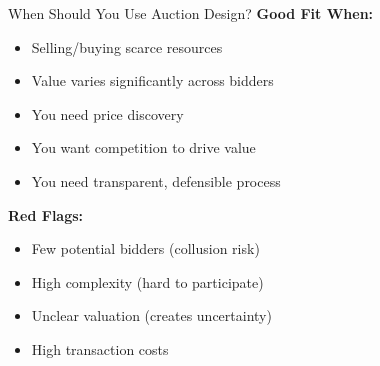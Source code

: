 \documentclass[xcolor={x11names}, aspectratio=169 ]{beamer}
\begin{document}
\begin{frame}{When Should You Use Auction Design?}
\textbf{Good Fit When:}
\begin{itemize}
  \item Selling/buying scarce resources
  \item Value varies significantly across bidders
  \item You need price discovery
  \item You want competition to drive value
  \item You need transparent, defensible process
\end{itemize}

\textbf{Red Flags:}
\begin{itemize}
  \item Few potential bidders (collusion risk)
  \item High complexity (hard to participate)
  \item Unclear valuation (creates uncertainty)
  \item High transaction costs
\end{itemize}
\end{frame}
\end{document}
